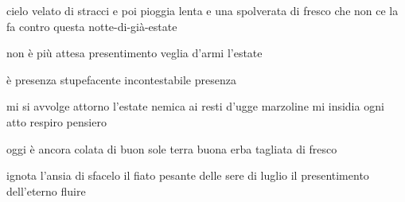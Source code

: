 \begin{volumetitlepage}
\end{volumetitlepage}


\begin{poem}
	\begin{stanza}
		cielo velato di stracci\verseline
		e poi pioggia lenta\verseline
		e una spolverata di fresco\verseline
		che non ce la fa contro\verseline
		questa notte-di-già-estate
	\end{stanza}
\end{poem}

\clearpage


\begin{poem}
	\begin{stanza}
		non è più attesa\verseline
		presentimento\verseline
		veglia d'armi l'estate
	\end{stanza}

	\begin{stanza}
		è presenza\verseline
		stupefacente\verseline
		incontestabile presenza
	\end{stanza}
\end{poem}

\clearpage


\begin{poem}
	\begin{stanza}
		mi si avvolge attorno l'estate\verseline
		nemica ai resti d'ugge marzoline\verseline
		mi insidia ogni atto respiro pensiero
	\end{stanza}

	\begin{stanza}
		oggi è ancora colata di buon sole\verseline
		terra buona\verseline
		erba tagliata di fresco
	\end{stanza}

	\begin{stanza}
		ignota l'ansia di sfacelo\verseline
		il fiato pesante delle sere di luglio\verseline
		il presentimento dell'eterno fluire
	\end{stanza}
\end{poem}

\clearpage


